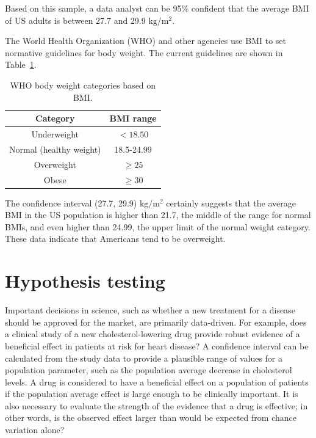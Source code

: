 \begin{example}
	Based on this sample, a data analyst can be 95\% confident that the average BMI of US adults is between 27.7 and 29.9 $\text{kg}/\text{m}{^2}$.

The World Health Organization (WHO) and other agencies use BMI to set normative guidelines for body weight. The current guidelines are shown in Table~\ref{whoBmiGuidelines}. 


\begin{table}[h!]
	\begin{center}
		\begin{tabular}{|c|c|}
			\hline 
			Category & BMI range\tabularnewline
			\hline 
			\hline 
			Underweight & $<18.50$\tabularnewline
			\hline 
			Normal (healthy weight) & 18.5-24.99\tabularnewline
			\hline 
			Overweight & $\geq 25$\tabularnewline
			\hline 
			Obese & $\geq30$\tabularnewline
			\hline
		\end{tabular}
		\caption{WHO body weight categories based on BMI.} 
		\label{whoBmiGuidelines}
	\end{center}
\end{table}

The confidence interval (27.7, 29.9) $\text{kg}/\text{m}{^2}$ certainly suggests that the average BMI in the US population is higher than 21.7, the middle of the range for normal BMIs, and even higher than 24.99, the upper limit of the normal weight category. These data indicate that Americans tend to be overweight. 

\end{example}



\newpage

\section[Hypothesis testing]{Hypothesis testing} %
\label{hypothesisTesting}


Important decisions in science, such as whether a new treatment for a disease should be approved for the market, are primarily data-driven. For example, does a clinical study of a new cholesterol-lowering drug provide robust evidence of a beneficial effect in patients at risk for heart disease? A confidence interval can be calculated from the study data to provide a plausible range of values for a population parameter, such as the population average decrease in cholesterol levels. A drug is considered to have a beneficial effect on a population of patients if the population average effect is large enough to be clinically important. It is also necessary to evaluate the strength of the evidence that a drug is effective; in other words, is the observed effect larger than would be expected from chance variation alone?

